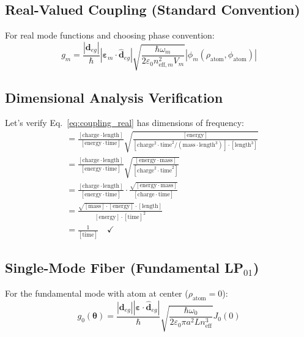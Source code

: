 \documentclass[12pt,a4paper]{article}
\begin{document}
\subsection{Real-Valued Coupling (Standard Convention)}

For real mode functions and choosing phase convention:
\begin{equation}
g_m = \frac{|\mathbf{d}_{eg}|}{\hbar}|\boldsymbol{\varepsilon}_m \cdot \hat{\mathbf{d}}_{eg}| \sqrt{\frac{\hbar\omega_m}{2\varepsilon_0 n_{\text{eff},m}^2 V_m}} |\phi_m(\rho_{\text{atom}}, \phi_{\text{atom}})| \label{eq:coupling_real}
\end{equation}

\subsection{Dimensional Analysis Verification}

Let's verify Eq.~\eqref{eq:coupling_real} has dimensions of frequency:
\begin{align*}
[g_m] &= \frac{[\text{charge} \cdot \text{length}]}{[\text{energy} \cdot \text{time}]} \sqrt{\frac{[\text{energy}]}{[\text{charge}^2 \cdot \text{time}^2/(\text{mass} \cdot \text{length}^3)] \cdot [\text{length}^3]}}\\
&= \frac{[\text{charge} \cdot \text{length}]}{[\text{energy} \cdot \text{time}]} \sqrt{\frac{[\text{energy} \cdot \text{mass}]}{[\text{charge}^2 \cdot \text{time}^2]}}\\
&= \frac{[\text{charge} \cdot \text{length}]}{[\text{energy} \cdot \text{time}]} \cdot \frac{\sqrt{[\text{energy} \cdot \text{mass}]}}{[\text{charge} \cdot \text{time}]}\\
&= \frac{\sqrt{[\text{mass}] \cdot [\text{energy}]} \cdot [\text{length}]}{[\text{energy}] \cdot [\text{time}]^2}\\
&= \frac{1}{[\text{time}]} \quad \checkmark
\end{align*}

\subsection{Single-Mode Fiber (Fundamental LP$_{01}$)}

For the fundamental mode with atom at center ($\rho_{\text{atom}} = 0$):
\begin{equation}
g_0(\boldsymbol{\theta}) = \frac{|\mathbf{d}_{eg}||\boldsymbol{\varepsilon} \cdot \hat{\mathbf{d}}_{eg}|}{\hbar} \sqrt{\frac{\hbar\omega_0}{2\varepsilon_0 \pi a^2 L n_{\text{eff}}^3}} J_0(0) \label{eq:g0_fiber}
\end{equation}
\end{document}
